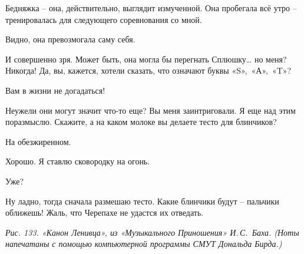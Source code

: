 \documentclass[../main.tex]{subfiles}
\begin{document}
\begin{dialogue}
 Бедняжка \--- она, действительно, выглядит измученной. Она пробегала всё утро \--- тренировалась для следующего соревнования со мной.

 Видно, она превозмогала саму себя.

 И совершенно зря. Может быть, она могла бы перегнать Сплюшку\ldots{} но меня? Никогда! Да, вы, кажется, хотели сказать, что означают буквы «S»,~«А»,~«T»?

 Вам в жизни не догадаться!

 Неужели они могут значит что-то еще? Вы меня заинтриговали. Я еще над этим поразмыслю. Скажите, а на каком молоке вы делаете тесто для блинчиков?

 На обезжиренном.

 Хорошо. Я ставлю сковородку на огонь.

 Уже?

 Ну ладно, тогда сначала размешаю тесто. Какие блинчики будут \--- пальчики оближешь! Жаль, что Черепахе не удастся их отведать.

\emph{Рис. 133. «Канон Ленивца», из «Музыкального Приношения» И.\,С.~Баха. (Ноты напечатаны с помощью компьютерной программы СМУТ Дональда Бирда.)}

\end{dialogue}
\end{document}
